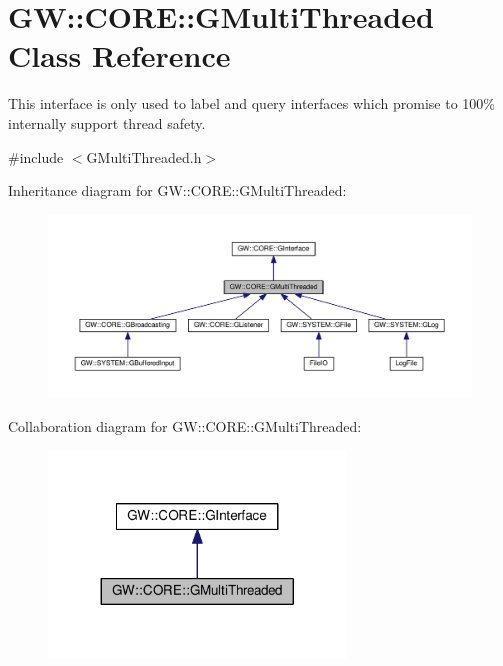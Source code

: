 \hypertarget{classGW_1_1CORE_1_1GMultiThreaded}{}\section{GW\+:\+:C\+O\+RE\+:\+:G\+Multi\+Threaded Class Reference}
\label{classGW_1_1CORE_1_1GMultiThreaded}


This interface is only used to label and query interfaces which promise to 100\% internally support thread safety.  




{\ttfamily \#include $<$G\+Multi\+Threaded.\+h$>$}



Inheritance diagram for GW\+:\+:C\+O\+RE\+:\+:G\+Multi\+Threaded\+:
\nopagebreak
\begin{figure}[H]
\begin{center}
\leavevmode
\includegraphics[width=350pt]{classGW_1_1CORE_1_1GMultiThreaded__inherit__graph}
\end{center}
\end{figure}


Collaboration diagram for GW\+:\+:C\+O\+RE\+:\+:G\+Multi\+Threaded\+:
\nopagebreak
\begin{figure}[H]
\begin{center}
\leavevmode
\includegraphics[width=224pt]{classGW_1_1CORE_1_1GMultiThreaded__coll__graph}
\end{center}
\end{figure}
